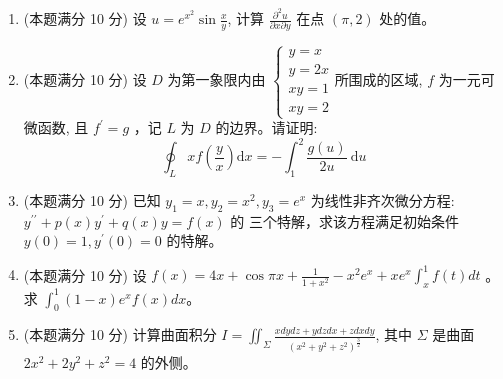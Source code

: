 \begin{enumerate}
\item 
(本题满分 10 分)
设 $u=e^{x^{2}} \sin \frac{x}{y}$, 计算 $\frac{\partial^{2} u}{\partial x \partial y}$ 在点 $(\pi, 2)$ 处的值。




\item 
(本题满分 10 分)
设 $D$ 为第一象限内由 $\left\{\begin{array}{l}y=x \\ y=2x \\ x y=1 \\ x y=2\end{array}\right.$所围成的区域, $f$ 为一元可微函数, 且 $f^{\prime}=g$ ，记 $L$ 为 $D$ 的边界。请证明:
\[
\oint_{L} x f\left(\frac{y}{x}\right) \mathrm{d} x=-\int_{1}^{2} \frac{g(u)}{2 u} \mathrm{~d} u
\]




\item 
(本题满分 10 分)
已知 $y_{1}=x, y_{2}=x^{2}, y_{3}=e^{x}$ 为线性非齐次微分方程: $y^{\prime \prime}+p(x) y^{\prime}+q(x) y=f(x)$ 的 三个特解，求该方程满足初始条件 $y(0)=1, y^{\prime}(0)=0$ 的特解。




\item 
(本题满分 10 分)
设 $f(x)=4 x+\cos \pi x+\frac{1}{1+x^{2}}-x^{2} e^{x}+x e^{x} \int_{x}^{1} f(t) d t$ 。 求 $\int_{0}^{1}(1-x) e^{x} f(x) d x$。



\newpage
\item 
(本题满分 10 分)
计算曲面积分 $I=\iint_{\Sigma} \frac{x d y d z+y d z d x+z d x d y}{\left(x^{2}+y^{2}+z^{2}\right)^{\frac{3}{2}}}$, 其中 $\Sigma$ 是曲面 $2 x^{2}+2 y^{2}+z^{2}=4$ 的外侧。




\end{enumerate}
